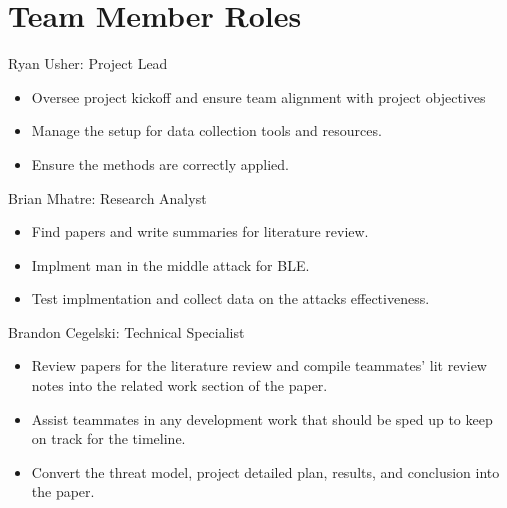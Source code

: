 \documentclass{article}
\begin{document}
    \section{Team Member Roles}

Ryan Usher: Project Lead
\begin{itemize}
    \item Oversee project kickoff and ensure team alignment with project objectives
    \item Manage the setup for data collection tools and resources.
    \item Ensure the methods are correctly applied.

\end{itemize}

Brian Mhatre: Research Analyst
\begin{itemize}
    \item Find papers and write summaries for literature review.
    \item Implment man in the middle attack for BLE.
    \item Test implmentation and collect data on the attacks effectiveness.
\end{itemize}

Brandon Cegelski: Technical Specialist
\begin{itemize}
    \item Review papers for the literature review and compile teammates' lit review notes into the related work section of the paper.
    \item Assist teammates in any development work that should be sped up to keep on track for the timeline.
    \item Convert the threat model, project detailed plan, results, and conclusion into the paper.
\end{itemize}
\end{document}
